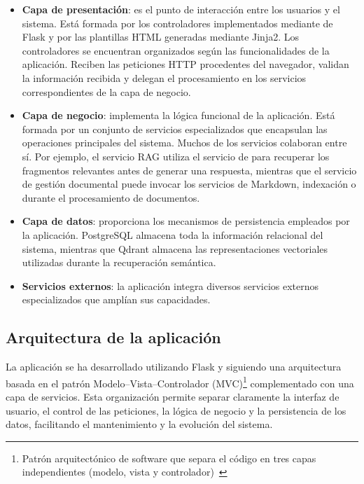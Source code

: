 
\begin{itemize}
	\item \textbf{Capa de presentación}: es el punto de interacción entre los usuarios y el sistema. Está formada por los controladores implementados mediante  de Flask y por las plantillas HTML generadas mediante Jinja2. Los controladores se encuentran organizados según las funcionalidades de la aplicación. Reciben las peticiones HTTP procedentes del navegador, validan la información recibida y delegan el procesamiento en los servicios correspondientes de la capa de negocio.
	\item \textbf{Capa de negocio}: implementa la lógica funcional de la aplicación. Está formada por un conjunto de servicios especializados que encapsulan las operaciones principales del sistema. Muchos de los servicios colaboran entre sí. Por ejemplo, el servicio RAG utiliza el servicio de  para recuperar los fragmentos relevantes antes de generar una respuesta, mientras que el servicio de gestión documental puede invocar los servicios de Markdown, indexación o  durante el procesamiento de documentos.
	\item \textbf{Capa de datos}: proporciona los mecanismos de persistencia empleados por la aplicación. PostgreSQL almacena toda la información relacional del sistema, mientras que Qdrant almacena las representaciones vectoriales utilizadas durante la recuperación semántica.
	\item \textbf{Servicios externos}: la aplicación integra diversos servicios externos especializados que amplían sus capacidades.
\end{itemize}


\subsection{Arquitectura de la aplicación }
\label{dis:MVC}
La aplicación  se ha desarrollado utilizando Flask y siguiendo una arquitectura basada en el patrón Modelo--Vista--Controlador (MVC)\footnote{Patrón arquitectónico de software que separa el código en tres capas independientes (modelo, vista y controlador)~\cite{diseño:MVC}} complementado con una capa de servicios. Esta organización permite separar claramente la interfaz de usuario, el control de las peticiones, la lógica de negocio y la persistencia de los datos, facilitando el mantenimiento y la evolución del sistema.

